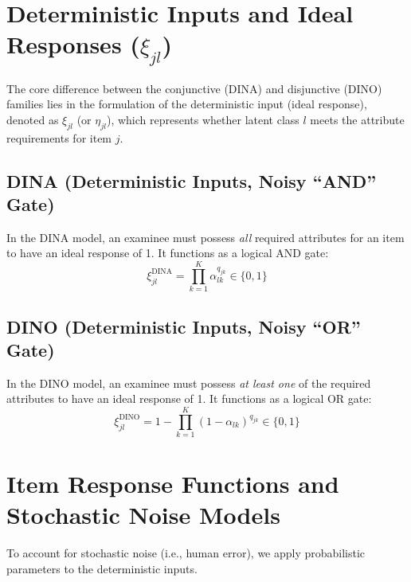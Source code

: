 \documentclass[11pt,a4paper]{article}
\begin{document}
\section{Deterministic Inputs and Ideal Responses (\texorpdfstring{$\xi_{jl}$}{xi\_jl})}

The core difference between the conjunctive (DINA) and disjunctive (DINO) 
families lies in the formulation of the deterministic input (ideal response), 
denoted as $\xi_{jl}$ (or $\eta_{jl}$), which represents whether 
latent class $l$ meets the attribute requirements for item $j$.

\subsection{DINA (Deterministic Inputs, Noisy ``AND'' Gate)}
In the DINA model, an examinee must possess \textit{all} required attributes 
for an item to have an ideal response of 1. 
It functions as a logical AND gate:
\begin{equation}
    \xi_{jl}^{\text{DINA}} = \prod_{k=1}^K \alpha_{lk}^{q_{jk}} \in \{0, 1\}
\end{equation}

\subsection{DINO (Deterministic Inputs, Noisy ``OR'' Gate)}
In the DINO model, an examinee must possess \textit{at least one} 
of the required attributes to have an ideal response of 1. 
It functions as a logical OR gate:
\begin{equation}
    \xi_{jl}^{\text{DINO}} = 1 - \prod_{k=1}^K (1 - \alpha_{lk})^{q_{jk}} \in \{0, 1\}
\end{equation}

\section{Item Response Functions and Stochastic Noise Models}

To account for stochastic noise (i.e., human error), 
we apply probabilistic parameters to the deterministic inputs.
\end{document}
